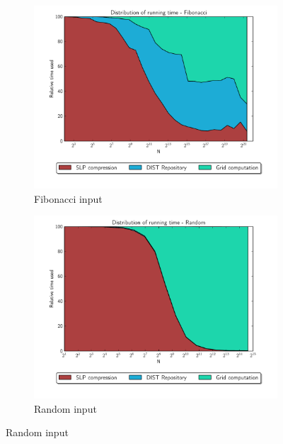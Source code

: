 \documentclass[twoside,11pt,openright]{report}
\begin{document}
\begin{figure}[!ht]
  \centering
  \begin{subfigure}{0.495\textwidth}
    \centering
    \includegraphics[width=\textwidth]{combined/fib_area_plot}
    \caption{Fibonacci input}
    \label{fig:benchmark:relative-runningtime-fib}
  \end{subfigure}
  \begin{subfigure}{0.495\textwidth}
    \centering
    \includegraphics[width=\textwidth]{combined/random_area_plot}
    \caption{Random input}
    \label{fig:benchmark:relative-runningtime-random}
  \end{subfigure}


\end{figure}
\end{document}
